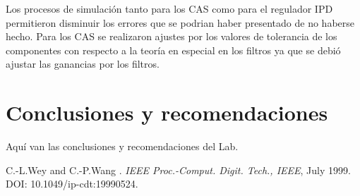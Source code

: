 \documentclass[12pt,a4paper]{article} %
\begin{document}
Los procesos de simulación tanto para los CAS como para el regulador IPD permitieron disminuir los errores que se podrian haber presentado de no haberse hecho. Para los CAS se realizaron ajustes por los valores de tolerancia de los componentes con respecto a la teoría en especial en los filtros ya que se debió ajustar las ganancias por los filtros.






\section{Conclusiones y recomendaciones}

Aquí van las conclusiones y recomendaciones del Lab.

\begin{thebibliography}{3}


C.-L.Wey and C.-P.Wang
.
\newblock \emph{IEEE Proc.-Comput. Digit. Tech., IEEE}, July 1999.
\newblock DOI: 10.1049/ip-cdt:19990524.

\end{thebibliography}
\end{document}
